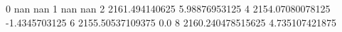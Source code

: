 0 nan nan
1 nan nan
2 2161.494140625 5.98876953125
4 2154.07080078125 -1.4345703125
6 2155.50537109375 0.0
8 2160.240478515625 4.735107421875
